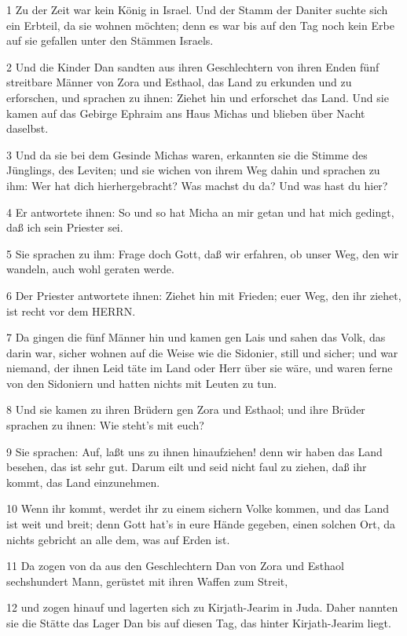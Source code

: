 \par 1 Zu der Zeit war kein König in Israel. Und der Stamm der Daniter suchte sich ein Erbteil, da sie wohnen möchten; denn es war bis auf den Tag noch kein Erbe auf sie gefallen unter den Stämmen Israels.
\par 2 Und die Kinder Dan sandten aus ihren Geschlechtern von ihren Enden fünf streitbare Männer von Zora und Esthaol, das Land zu erkunden und zu erforschen, und sprachen zu ihnen: Ziehet hin und erforschet das Land. Und sie kamen auf das Gebirge Ephraim ans Haus Michas und blieben über Nacht daselbst.
\par 3 Und da sie bei dem Gesinde Michas waren, erkannten sie die Stimme des Jünglings, des Leviten; und sie wichen von ihrem Weg dahin und sprachen zu ihm: Wer hat dich hierhergebracht? Was machst du da? Und was hast du hier?
\par 4 Er antwortete ihnen: So und so hat Micha an mir getan und hat mich gedingt, daß ich sein Priester sei.
\par 5 Sie sprachen zu ihm: Frage doch Gott, daß wir erfahren, ob unser Weg, den wir wandeln, auch wohl geraten werde.
\par 6 Der Priester antwortete ihnen: Ziehet hin mit Frieden; euer Weg, den ihr ziehet, ist recht vor dem HERRN.
\par 7 Da gingen die fünf Männer hin und kamen gen Lais und sahen das Volk, das darin war, sicher wohnen auf die Weise wie die Sidonier, still und sicher; und war niemand, der ihnen Leid täte im Land oder Herr über sie wäre, und waren ferne von den Sidoniern und hatten nichts mit Leuten zu tun.
\par 8 Und sie kamen zu ihren Brüdern gen Zora und Esthaol; und ihre Brüder sprachen zu ihnen: Wie steht's mit euch?
\par 9 Sie sprachen: Auf, laßt uns zu ihnen hinaufziehen! denn wir haben das Land besehen, das ist sehr gut. Darum eilt und seid nicht faul zu ziehen, daß ihr kommt, das Land einzunehmen.
\par 10 Wenn ihr kommt, werdet ihr zu einem sichern Volke kommen, und das Land ist weit und breit; denn Gott hat's in eure Hände gegeben, einen solchen Ort, da nichts gebricht an alle dem, was auf Erden ist.
\par 11 Da zogen von da aus den Geschlechtern Dan von Zora und Esthaol sechshundert Mann, gerüstet mit ihren Waffen zum Streit,
\par 12 und zogen hinauf und lagerten sich zu Kirjath-Jearim in Juda. Daher nannten sie die Stätte das Lager Dan bis auf diesen Tag, das hinter Kirjath-Jearim liegt.
